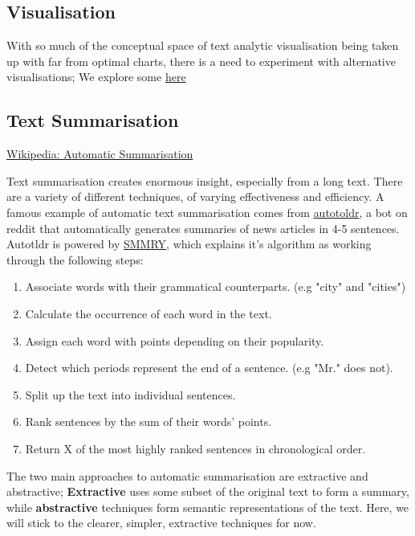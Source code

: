 \documentclass[11pt]{article}
\begin{document}
\subsection{Visualisation}
\label{sec:org8a46a18}
With so much of the conceptual space of text analytic visualisation
being taken up with far from optimal charts, there is a need to
experiment with alternative visualisations; We explore some \href{sent-vis.org}{here}
\subsection{Text Summarisation}
\label{sec:org1bdc583}

\href{https://en.wikipedia.org/wiki/Automatic\_summarization}{Wikipedia: Automatic Summarisation}

Text summarisation creates enormous insight, especially from a long
text. There are a variety of different techniques, of varying
effectiveness and efficiency. A famous example of automatic text
summarisation comes from \href{https://www.reddit.com/user/autotldr}{autotoldr}, a bot on reddit that automatically
generates summaries of news articles in 4-5 sentences. Autotldr is
powered by \href{https://smmry.com/about}{SMMRY}, which explains it's algorithm as working through the
following steps:

\begin{enumerate}
\item Associate words with their grammatical counterparts. (e.g "city"
and "cities")
\item Calculate the occurrence of each word in the text.
\item Assign each word with points depending on their popularity.
\item Detect which periods represent the end of a sentence. (e.g "Mr."
does not).
\item Split up the text into individual sentences.
\item Rank sentences by the sum of their words' points.
\item Return X of the most highly ranked sentences in chronological
order.
\end{enumerate}

The two main approaches to automatic summarisation are extractive and
abstractive; \textbf{Extractive} uses some subset of the original text to
form a summary, while \textbf{abstractive} techniques form semantic
representations of the text. Here, we will stick to the clearer,
simpler, extractive techniques for now.
\end{document}
